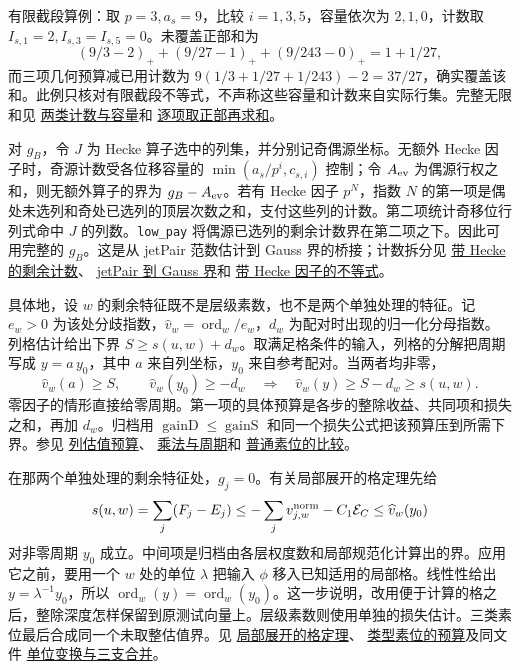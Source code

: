 \documentclass[UTF8,fontset=none,a4paper,11pt]{ctexart}
\theoremstyle{definition}
\newcommand{\src}[3]{\href{https://github.com/leanprover-community/riemann-hypothesis/blob/23aebbb302010b292314d406aa97f7901d698634/src/#1.lean\#L#2}{#3}}
\begin{document}
有限截段算例：取 $p=3,a_s=9$，比较 $i=1,3,5$，容量依次为 $2,1,0$，计数取 $I_{s,1}=2,I_{s,3}=I_{s,5}=0$。未覆盖正部和为
\[
 (9/3-2)_+ +(9/27-1)_+ +(9/243-0)_+=1+1/27,
\]
而三项几何预算减已用计数为 $9(1/3+1/27+1/243)-2=37/27$，确实覆盖该和。此例只核对有限截段不等式，不声称这些容量和计数来自实际行集。完整无限和见
\src{Formalism/ThetaLogCoordinates/UniformThetaSubstitution/FrobeniusLiftNorms/EntryAOneParity}{177}{两类计数与容量}和
\src{Formalism/ThetaLogCoordinates/UniformThetaSubstitution/FrobeniusLiftNorms/ABArith}{193}{逐项取正部再求和}。

对 $g_B$，令 $J$ 为 Hecke 算子选中的列集，并分别记奇偶源坐标。无额外 Hecke 因子时，奇源计数受各位移容量的 $\min(a_s/p^i,c_{s,i})$ 控制；令 $A_{\rm ev}$ 为偶源行权之和，则无额外算子的界为 $g_B-A_{\rm ev}$。若有 Hecke 因子 $p^N$，指数 $N$ 的第一项是偶处未选列和奇处已选列的顶层次数之和，支付这些列的计数。第二项统计奇移位行列式命中 $J$ 的列数。\texttt{low\_pay} 将偶源已选列的剩余计数界在第二项之下。因此可用完整的 $g_B$。这是从 jetPair 范数估计到 Gauss 界的桥接；计数拆分见
\src{Formalism/ThetaLogCoordinates/UniformThetaSubstitution/FrobeniusLiftNorms/EntryATwoAndB}{303}{带 Hecke 的剩余计数}、
\src{Formalism/ThetaLogCoordinates/UniformThetaSubstitution/FrobeniusLiftNorms/EGaussK}{166}{jetPair 到 Gauss 界}和
\src{Formalism/ThetaLogCoordinates/UniformThetaSubstitution/StatementE}{211}{带 Hecke 因子的不等式}。

具体地，设 $w$ 的剩余特征既不是层级素数，也不是两个单独处理的特征。记 $e_w>0$ 为该处分歧指数，$\widehat v_w=\operatorname{ord}_w/e_w$，$d_w$ 为配对时出现的归一化分母指数。列格估计给出下界 $S\ge s(u,w)+d_w$。取满足格条件的输入，列格的分解把周期写成 $y=a\,y_0$，其中 $a$ 来自列坐标，$y_0$ 来自参考配对。当两者均非零，
\[
 \widehat v_w(a)\ge S,\qquad
 \widehat v_w(y_0)\ge-d_w
 \quad\Longrightarrow\quad
 \widehat v_w(y)\ge S-d_w\ge s(u,w).
\]
零因子的情形直接给零周期。第一项的具体预算是各步的整除收益、共同项和损失之和，再加 $d_w$。归档用 $\operatorname{gainD}\le\operatorname{gainS}$ 和同一个损失公式把该预算压到所需下界。参见
\src{Formalism/SharpRestriction/GrowthBounds/WeilJacquetShalikaLaw}{76}{列估值预算}、
\src{Formalism/SharpRestriction/GrowthBounds/WeilJacquetShalikaLaw}{401}{乘法与周期}和
\src{Formalism/SharpRestriction/Divisibility/WeightDegreeSizes}{973}{普通素位的比较}。

在那两个单独处理的剩余特征处，$g_j=0$。有关局部展开的格定理先给
\[
 s(u,w)=\sum_j(F_j-E_j)
 \le -\sum_j v_{j,w}^{\rm norm}-C_1\mathcal E_C
 \le \widehat v_w(y_0)
\]
对非零周期 $y_0$ 成立。中间项是归档由各层权度数和局部规范化计算出的界。应用它之前，要用一个 $w$ 处的单位 $\lambda$ 把输入 $\phi$ 移入已知适用的局部格。线性性给出 $y=\lambda^{-1}y_0$，所以
$\operatorname{ord}_w(y)=\operatorname{ord}_w(y_0)$。这一步说明，改用便于计算的格之后，整除深度怎样保留到原测试向量上。层级素数则使用单独的损失估计。三类素位最后合成同一个未取整估值界。见
\src{Formalism/SharpRestriction/Divisibility/LiftErrorLocal}{426}{局部展开的格定理}、
\src{Formalism/SharpRestriction/Divisibility/WeightDegreeSizes}{1002}{类型素位的预算}及同文件
\src{Formalism/SharpRestriction/Divisibility/WeightDegreeSizes}{1038}{单位变换与三支合并}。
\end{document}
